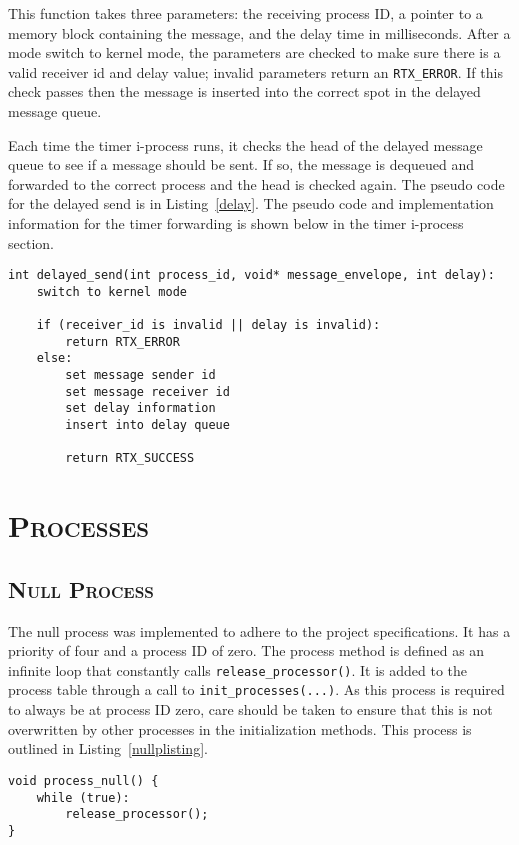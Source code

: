 \documentclass[oneside]{report}
\begin{document}
This function takes three parameters: the receiving process ID, a
pointer to a memory block containing the message, and the delay time
in milliseconds. After a mode switch to kernel mode, the parameters
are checked to make sure there is a valid receiver id and delay value;
invalid parameters return an \texttt{RTX\_ERROR}. If this check passes
then the message is inserted into the correct spot in the delayed
message queue.

Each time the timer i-process runs, it checks the head of the delayed
message queue to see if a message should be sent. If so, the message
is dequeued and forwarded to the correct process and the head is
checked again. The pseudo code for the delayed send is in
Listing~\ref{delay}. The pseudo code and implementation information
for the timer forwarding is shown below in the timer i-process
section.

\begin{lstlisting}
int delayed_send(int process_id, void* message_envelope, int delay):
    switch to kernel mode

    if (receiver_id is invalid || delay is invalid):
        return RTX_ERROR
    else:
        set message sender id
        set message receiver id
        set delay information
        insert into delay queue

        return RTX_SUCCESS
\end{lstlisting}



\section{\textsc{Processes}}
\subsection{\textsc{Null Process}}
The null process was implemented to adhere to the project specifications. It
has a priority of four and a process ID of zero. The process method is defined 
as an infinite loop that constantly calls \texttt{release\_processor()}. It is 
added to the process table through a call to \texttt{init\_processes(...)}. As
this process is required to always be at process ID zero, care should be taken
to ensure that this is not overwritten by other processes in the initialization
methods. This process is outlined in Listing~\ref{nullplisting}.

\begin{lstlisting}
void process_null() {
    while (true):
        release_processor();
}
\end{lstlisting}
\end{document}
